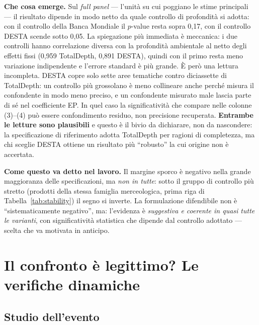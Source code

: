 \documentclass[11pt,a4paper]{article}
\begin{document}
\textbf{Che cosa emerge.} Sul \emph{full panel} --- l'unit\`a su cui poggiano le stime
principali --- il risultato dipende in modo netto da quale controllo di profondit\`a si
adotta: con il controllo della Banca Mondiale il $p$-value resta sopra 0,17, con il
controllo DESTA scende sotto 0,05. La spiegazione pi\`u immediata \`e meccanica: i due
controlli hanno correlazione diversa con la profondit\`a ambientale al netto degli effetti
fissi (0,959 TotalDepth, 0,891 DESTA), quindi con il primo resta meno variazione indipendente
e l'errore standard \`e pi\`u grande. \`E per\`o una lettura incompleta. DESTA copre solo
sette aree tematiche contro diciassette di TotalDepth: un controllo pi\`u grossolano \`e
meno collineare anche perch\'e misura il confondente in modo meno preciso, e un confondente
misurato male lascia parte di s\'e nel coefficiente EP. In quel caso la significativit\`a che
compare nelle colonne (3)--(4) pu\`o essere confondimento residuo, non precisione recuperata.
\textbf{Entrambe le letture sono plausibili} e questo \`e il bivio da dichiarare, non da
nascondere: la specificazione di riferimento adotta TotalDepth per ragioni di completezza, ma
chi sceglie DESTA ottiene un risultato pi\`u ``robusto'' la cui origine non \`e accertata.

\textbf{Come questo va detto nel lavoro.} Il margine sporco \`e negativo nella grande
maggioranza delle specificazioni, ma \emph{non in tutte}: sotto il gruppo di controllo pi\`u
stretto (prodotti della stessa famiglia merceologica, prima riga di Tabella~\ref{tab:stability})
il segno si inverte. La formulazione difendibile non \`e ``sistematicamente negativo'', ma:
l'evidenza \`e \emph{suggestiva e coerente in quasi tutte le varianti}, con significativit\`a
statistica che dipende dal controllo adottato --- scelta che va motivata in anticipo.



\clearpage
\section{Il confronto \`e legittimo? Le verifiche dinamiche}

\subsection{Studio dell'evento}
\end{document}

